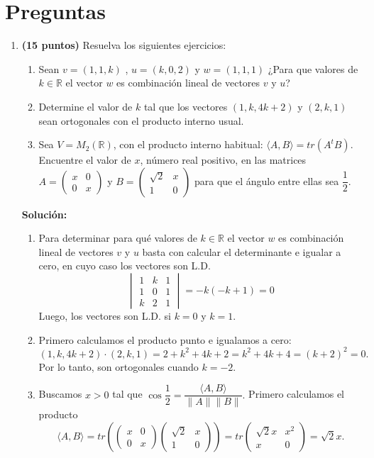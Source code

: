 \documentclass[a4paper]{article}
\theoremstyle{exampstyle}
\theoremstyle{definition}
\begin{document}
\section*{Preguntas}
\begin{enumerate}


\item {\bf (15 puntos)} Resuelva los siguientes ejercicios:
\begin{enumerate} 
    \item Sean $v = (1, 1, k)$ , $u = (k, 0, 2)$ y $ w = (1, 1, 1)$ ¿Para que valores de $k\in \mathbb{R}$ el vector $w$ es combinaci\'on lineal de vectores $v$ y $u$?
    \item Determine el valor de $k$ tal que los vectores $(1, k, 4k+2)$ y $(2, k, 1 )$ sean ortogonales con el producto interno usual.
\item Sea $V=M_2(\mathbb{R})$, con el producto interno habitual: $\langle A, B\rangle = tr(A^tB)$. Encuentre el valor de $x$, n\'umero real positivo, en las matrices ${A=\begin{pmatrix} x & 0 \\  0 & x\end{pmatrix}}$ y $B=\begin{pmatrix} \sqrt{2} & x \\  1 & 0\end{pmatrix}$ para que el \'angulo entre ellas sea $\dfrac{1}{2}$.
\end{enumerate}
\textbf{Soluci\'on:} 
\begin{enumerate}
    \item Para determinar para qu\'e valores de $k\in \mathbb{R}$ el vector $w$ es combinaci\'on lineal de vectores $v$ y $u$ basta con calcular el determinante e igualar a cero, en cuyo caso los vectores son L.D.
\[    \begin{vmatrix} 1 & k & 1 \\ 1 & 0 & 1 \\ k & 2 & 1 \end{vmatrix}=-k(-k+1)=0\]
Luego, los vectores son L.D. si $k=0$ y $k=1$.
\item Primero calculamos el producto punto e igualamos a cero:
\[(1, k, 4k+2)\cdot (2, k, 1 )=2+k^2+4k+2=k^2+4k+4=(k+2)^2=0.\]
Por lo tanto, son ortogonales cuando $k=-2$.
\item Buscamos $x>0$ tal que $  \cos \dfrac{1}{2} =\dfrac{\langle A, B\rangle}{\|A\|\| B\|}.$ Primero calculamos el producto
\[\langle A, B\rangle=tr\left(\begin{pmatrix} x & 0 \\  0 & x\end{pmatrix}\begin{pmatrix} \sqrt{2} & x \\  1 & 0\end{pmatrix}\right)=tr\begin{pmatrix} \sqrt{2}x & x^2 \\  x & 0\end{pmatrix}=\sqrt{2}x.\]


\end{enumerate}
\end{enumerate}
\end{document}
